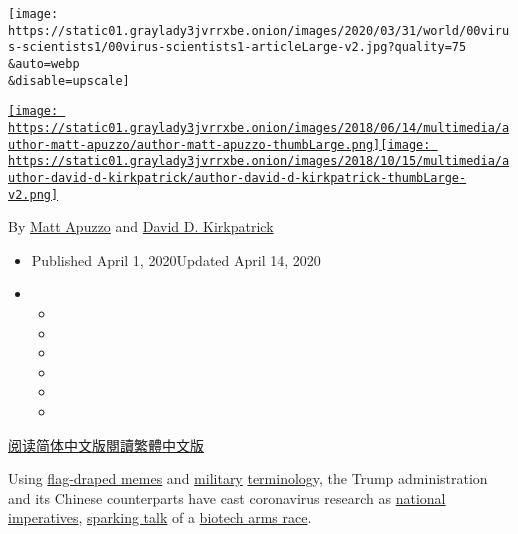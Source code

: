 \texttt{[image: https://static01.graylady3jvrrxbe.onion/images/2020/03/31/world/00virus-scientists1/00virus-scientists1-articleLarge-v2.jpg?quality=75\\\&auto=webp\\\&disable=upscale]}

\href{https://www.nytimes3xbfgragh.onion/by/matt-apuzzo}{\texttt{[image: https://static01.graylady3jvrrxbe.onion/images/2018/06/14/multimedia/author-matt-apuzzo/author-matt-apuzzo-thumbLarge.png]}}\href{https://www.nytimes3xbfgragh.onion/by/david-d-kirkpatrick}{\texttt{[image: https://static01.graylady3jvrrxbe.onion/images/2018/10/15/multimedia/author-david-d-kirkpatrick/author-david-d-kirkpatrick-thumbLarge-v2.png]}}

By \href{https://www.nytimes3xbfgragh.onion/by/matt-apuzzo}{Matt Apuzzo}
and
\href{https://www.nytimes3xbfgragh.onion/by/david-d-kirkpatrick}{David
D. Kirkpatrick}

\begin{itemize}
\item
  Published April 1, 2020Updated April 14, 2020
\item
  \begin{itemize}
  \item
  \item
  \item
  \item
  \item
  \item
  \end{itemize}
\end{itemize}

\href{https://cn.nytimes3xbfgragh.onion/world/20200402/coronavirus-science-research-cooperation/}{阅读简体中文版}\href{https://cn.nytimes3xbfgragh.onion/world/20200402/coronavirus-science-research-cooperation/zh-hant/}{閱讀繁體中文版}

Using
\href{https://twitter.com/realDonaldTrump/status/1244029041432244224}{flag-draped
memes} and
\href{https://www.scmp.com/news/china/military/article/3075396/how-chinas-military-took-frontline-role-coronavirus-crisis}{military}
\href{https://www.nytimes3xbfgragh.onion/2020/03/22/us/politics/coronavirus-trump-wartime-president.html}{terminolog}y,
the Trump administration and its Chinese counterparts have cast
coronavirus research as
\href{https://twitter.com/realdonaldtrump/status/1237813728558678026}{national
imperatives},
\href{https://www.abacusnews.com/tech/how-china-and-us-are-racing-develop-coronavirus-vaccines/article/3075760?utm_content=article\&utm_medium=Social\&utm_source=Facebook\#Echobox=1584522387}{sparking
talk} of a
\href{https://www.nytimes3xbfgragh.onion/2020/03/19/us/politics/coronavirus-vaccine-competition.html}{biotech
arms race}.

